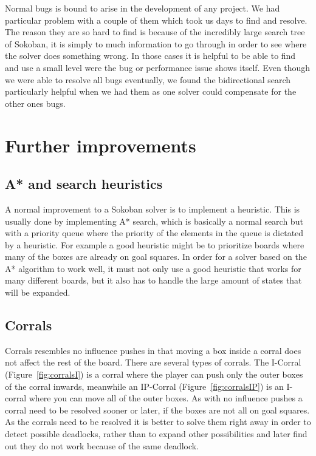 \documentclass[a4paper,12pt]{article}
\renewcommand{\*}[0]{\cdot}
\begin{document}

Normal bugs is bound to arise in the development of any project. We had
particular problem with a couple of them which took us days to find and resolve.
The reason they are so hard to find is because of the incredibly large search
tree of Sokoban, it is simply to much information to go through in order to see
where the solver does something wrong. In those cases it is helpful to be able
to find and use a small level were the bug or performance issue shows itself.
Even though we were able to resolve all bugs eventually, we found the
bidirectional search particularly helpful when we had them as one solver could
compensate for the other ones bugs.


\section{Further improvements}

\subsection{A* and search heuristics}

A normal improvement to a Sokoban solver is to implement a heuristic. This is
usually done by implementing A* search, which is basically a normal search but
with a priority queue where the priority of the elements in the queue is
dictated by a heuristic. For example a good heuristic might be to prioritize
boards where many of the boxes are already on goal squares. In order for a
solver based on the A* algorithm to work well, it must not only use a good
heuristic that works for many different boards, but it also has to handle the
large amount of states that will be expanded.


\subsection{Corrals}

Corrals resembles no influence pushes in that moving a box inside a corral does
not affect the rest of the board.  There are several types of corrals. The
I-Corral (Figure~\ref{fig:corralsI}) is a corral where the player can push only
the outer boxes of the corral inwards, meanwhile an IP-Corral
(Figure~\ref{fig:corralsIP}) is an I-corral where you can move all of the outer
boxes. As with no influence pushes a corral need to be resolved sooner or later,
if the boxes are not all on goal squares.  As the corrals need to be resolved it
is better to solve them right away in order to detect possible deadlocks, rather
than to expand other possibilities and later find out they do not work because
of the same deadlock.
\end{document}
